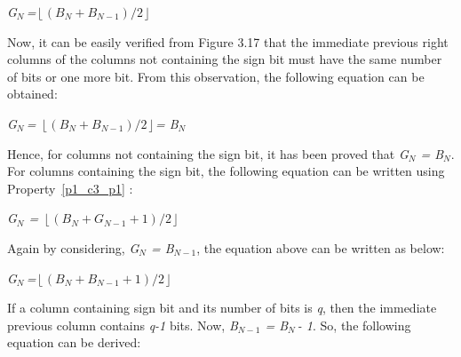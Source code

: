 \noindent \begin{center}
	\textit{G${}_{N\ }$=}$\left\lfloor (B_{N} +B_{N-1} )/2\right\rfloor $
\end{center}

\noindent \begin{flushleft}
	
\end{flushleft}

\noindent Now, it can be easily verified from Figure 3.17 that the immediate previous right columns of the columns not containing the sign bit must have the same number of bits or one more bit. From this observation, the following equation can be obtained:  

\noindent \begin{center}
	\textit{G${}_{N\ }$= }$\left\lfloor (B_{N} +B_{N-1} )/2\right\rfloor $\textit{= B${}_{N}$}
\end{center}

\noindent \begin{flushleft}
	
\end{flushleft}

\noindent Hence, for columns not containing the sign bit, it has been proved that \textit{G${}_{N}$ = B${}_{N}$}. For columns containing the sign bit, the following equation can be written using Property~\ref{p1_c3_p1} :

\noindent \begin{center}
	\textit{G${}_{N}$ = }$\left\lfloor (B_{N} +G_{N-1} +1)/2\right\rfloor $
\end{center}

\noindent \begin{flushleft}
	
\end{flushleft}

\noindent Again by considering, \textit{G${}_{N}$ = B${}_{N-1}$}, the equation above can be written as below:

\noindent \begin{center}
	\textit{G${}_{N\ }$=}$\left\lfloor (B_{N} +B_{N-1} +1)/2\right\rfloor $
\end{center}

\noindent \begin{flushleft}
	
\end{flushleft}

\noindent If a column containing sign bit and its number of bits is \textit{q}, then the immediate previous column contains \textit{q-1 }bits. Now, \textit{B${}_{N-1}$ = B${}_{N\ }$- 1}. So, the following equation can be derived:

